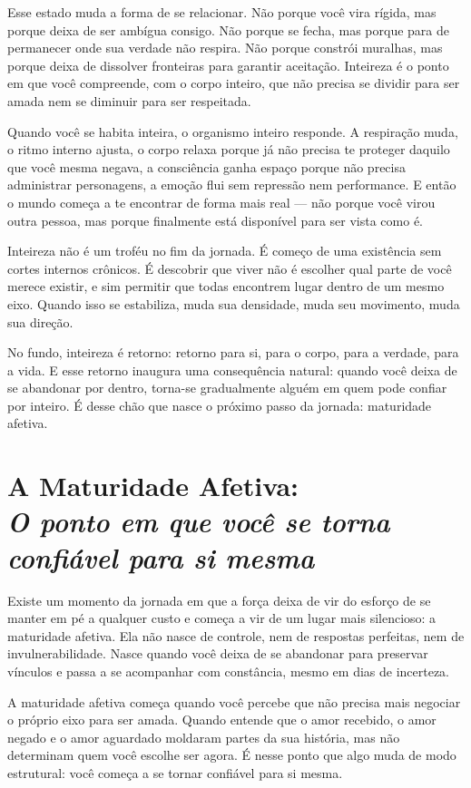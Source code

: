 \documentclass[12pt]{book}
\begin{document}
Esse estado muda a forma de se relacionar. Não porque você vira rígida, mas porque deixa de ser ambígua consigo. Não porque se fecha, mas porque para de permanecer onde sua verdade não respira. Não porque constrói muralhas, mas porque deixa de dissolver fronteiras para garantir aceitação. Inteireza é o ponto em que você compreende, com o corpo inteiro, que não precisa se dividir para ser amada nem se diminuir para ser respeitada.

Quando você se habita inteira, o organismo inteiro responde. A respiração muda, o ritmo interno ajusta, o corpo relaxa porque já não precisa te proteger daquilo que você mesma negava, a consciência ganha espaço porque não precisa administrar personagens, a emoção flui sem repressão nem performance. E então o mundo começa a te encontrar de forma mais real — não porque você virou outra pessoa, mas porque finalmente está disponível para ser vista como é.

Inteireza não é um troféu no fim da jornada. É começo de uma existência sem cortes internos crônicos. É descobrir que viver não é escolher qual parte de você merece existir, e sim permitir que todas encontrem lugar dentro de um mesmo eixo. Quando isso se estabiliza, muda sua densidade, muda seu movimento, muda sua direção.

No fundo, inteireza é retorno: retorno para si, para o corpo, para a verdade, para a vida. E esse retorno inaugura uma consequência natural: quando você deixa de se abandonar por dentro, torna-se gradualmente alguém em quem pode confiar por inteiro. É desse chão que nasce o próximo passo da jornada: maturidade afetiva.

\chapter[A Maturidade Afetiva: O ponto em que você se torna confiável para si mesma]{A Maturidade Afetiva:\\[0.4ex]\large\itshape O ponto em que você se torna confiável para si mesma}

Existe um momento da jornada em que a força deixa de vir do esforço de se manter em pé a qualquer custo e começa a vir de um lugar mais silencioso: a maturidade afetiva. Ela não nasce de controle, nem de respostas perfeitas, nem de invulnerabilidade. Nasce quando você deixa de se abandonar para preservar vínculos e passa a se acompanhar com constância, mesmo em dias de incerteza.

A maturidade afetiva começa quando você percebe que não precisa mais negociar o próprio eixo para ser amada. Quando entende que o amor recebido, o amor negado e o amor aguardado moldaram partes da sua história, mas não determinam quem você escolhe ser agora. É nesse ponto que algo muda de modo estrutural: você começa a se tornar confiável para si mesma.
\end{document}
